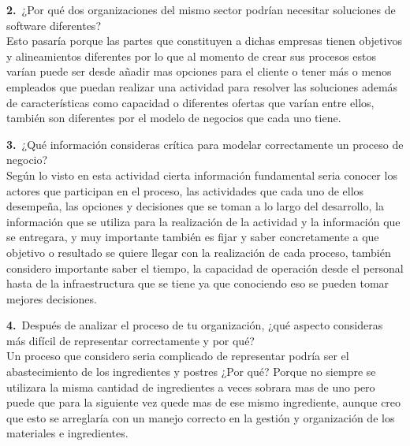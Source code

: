 \documentclass[12pt,letterpaper]{article}
\newcommand{\negr}[1]{\textsf{\bfseries\color{verde} #1}}
\begin{document}
\vspace{0.4cm}
\noindent\negr{2.}\ ¿Por qué dos organizaciones del mismo sector podrían necesitar soluciones de software diferentes?\\
Esto pasaría porque las partes que constituyen a dichas empresas tienen objetivos y alineamientos diferentes por lo que al momento de crear sus procesos estos varían puede ser desde añadir mas opciones para el cliente o tener más o menos empleados que puedan realizar una actividad para resolver las soluciones además de características como capacidad o diferentes ofertas que varían entre ellos, también son diferentes por el modelo de negocios que cada uno tiene.

\vspace{0.4cm}
\noindent\negr{3.}\ ¿Qué información consideras crítica para modelar correctamente un proceso de negocio?\\
Según lo visto en esta actividad cierta información fundamental seria conocer los actores que participan en el proceso, las actividades que cada uno de ellos desempeña, las opciones y decisiones que se toman a lo largo del desarrollo, la información que se utiliza para la realización de la actividad y la información que se entregara, y muy importante también es fijar y saber concretamente a que objetivo o resultado se quiere llegar con la realización de cada proceso, también considero importante saber el tiempo, la capacidad de operación desde el personal hasta de la infraestructura que se tiene ya que conociendo eso se pueden tomar mejores decisiones.

\vspace{0.4cm}
\noindent\negr{4.}\ Después de analizar el proceso de tu organización, ¿qué aspecto consideras más difícil de representar correctamente y por qué?\\
Un proceso que considero seria complicado de representar podría ser el abastecimiento de los ingredientes y postres ¿Por qué? Porque no siempre se utilizara la misma cantidad de ingredientes a veces sobrara mas de uno pero puede que para la siguiente vez quede mas de ese mismo ingrediente, aunque creo que esto se arreglaría con un manejo correcto en la gestión y organización de los materiales e ingredientes.

\clearpage
\end{document}

